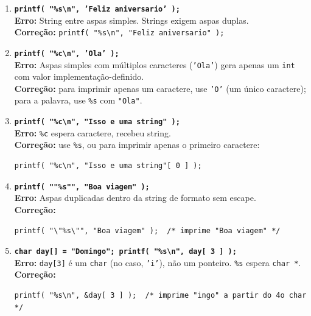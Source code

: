 \documentclass[12pt,a4paper]{article}
\begin{document}
\begin{respostabox}
\begin{enumerate}[label=\textbf{\alph*)}]

\item \textbf{\texttt{printf( "\%s\textbackslash n", 'Feliz aniversario' );}}\\
\textbf{Erro:} String entre aspas simples. Strings exigem aspas duplas.\\
\textbf{Correção:} \texttt{printf( "\%s\textbackslash n", "Feliz aniversario" );}

\item \textbf{\texttt{printf( "\%c\textbackslash n", 'Ola' );}}\\
\textbf{Erro:} Aspas simples com múltiplos caracteres (\texttt{'Ola'}) gera apenas
um \texttt{int} com valor implementação-definido.\\
\textbf{Correção:} para imprimir apenas um caractere, use \texttt{'O'} (um único
caractere); para a palavra, use \texttt{\%s} com \texttt{"Ola"}.

\item \textbf{\texttt{printf( "\%c\textbackslash n", "Isso e uma string" );}}\\
\textbf{Erro:} \texttt{\%c} espera caractere, recebeu string.\\
\textbf{Correção:} use \texttt{\%s}, ou para imprimir apenas o primeiro caractere:
\begin{lstlisting}
printf( "%c\n", "Isso e uma string"[ 0 ] );
\end{lstlisting}

\item \textbf{\texttt{printf( ""\%s"", "Boa viagem" );}}\\
\textbf{Erro:} Aspas duplicadas dentro da string de formato sem escape.\\
\textbf{Correção:}
\begin{lstlisting}
printf( "\"%s\"", "Boa viagem" );  /* imprime "Boa viagem" */
\end{lstlisting}

\item \textbf{\texttt{char day[] = "Domingo"; printf( "\%s\textbackslash n", day[ 3 ] );}}\\
\textbf{Erro:} \texttt{day[3]} é um \texttt{char} (no caso, \texttt{'i'}), não um
ponteiro. \texttt{\%s} espera \texttt{char *}.\\
\textbf{Correção:}
\begin{lstlisting}
printf( "%s\n", &day[ 3 ] );  /* imprime "ingo" a partir do 4o char */
\end{lstlisting}


\end{enumerate}
\end{respostabox}
\end{document}
